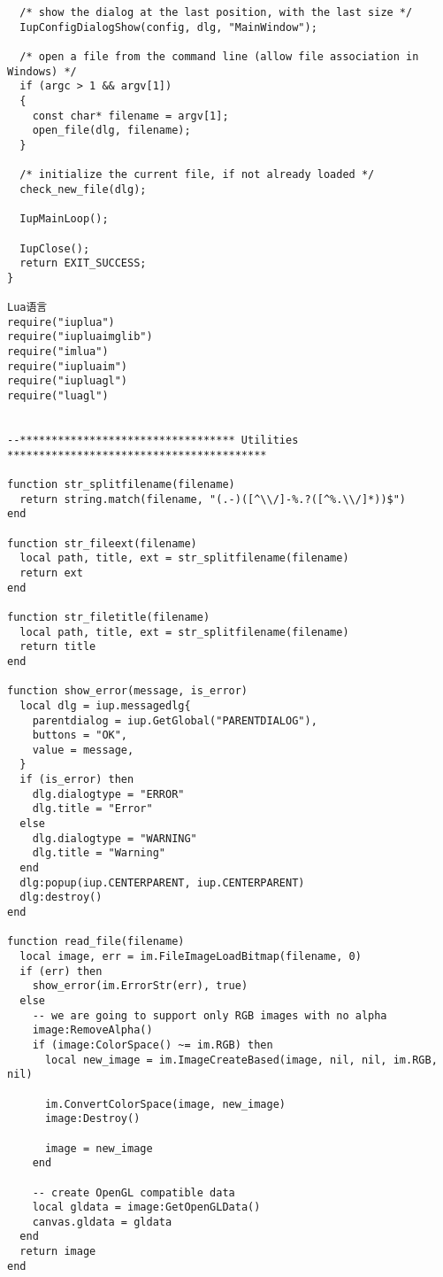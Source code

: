 \documentclass{ctexart}
\begin{document}
\begin{lstlisting}
  /* show the dialog at the last position, with the last size */
  IupConfigDialogShow(config, dlg, "MainWindow");

  /* open a file from the command line (allow file association in Windows) */
  if (argc > 1 && argv[1])
  {
    const char* filename = argv[1];
    open_file(dlg, filename);
  }

  /* initialize the current file, if not already loaded */
  check_new_file(dlg);

  IupMainLoop();

  IupClose();
  return EXIT_SUCCESS;
}

Lua语言
require("iuplua")
require("iupluaimglib")
require("imlua")
require("iupluaim")
require("iupluagl")
require("luagl")


--********************************** Utilities *****************************************

function str_splitfilename(filename)
  return string.match(filename, "(.-)([^\\/]-%.?([^%.\\/]*))$")
end

function str_fileext(filename)
  local path, title, ext = str_splitfilename(filename)
  return ext
end

function str_filetitle(filename)
  local path, title, ext = str_splitfilename(filename)
  return title
end

function show_error(message, is_error)
  local dlg = iup.messagedlg{
    parentdialog = iup.GetGlobal("PARENTDIALOG"),
    buttons = "OK",
    value = message,
  }
  if (is_error) then
    dlg.dialogtype = "ERROR"
    dlg.title = "Error"
  else
    dlg.dialogtype = "WARNING"
    dlg.title = "Warning"
  end
  dlg:popup(iup.CENTERPARENT, iup.CENTERPARENT)
  dlg:destroy()
end

function read_file(filename)
  local image, err = im.FileImageLoadBitmap(filename, 0)
  if (err) then
    show_error(im.ErrorStr(err), true)
  else
    -- we are going to support only RGB images with no alpha
    image:RemoveAlpha()
    if (image:ColorSpace() ~= im.RGB) then
      local new_image = im.ImageCreateBased(image, nil, nil, im.RGB, nil)        

      im.ConvertColorSpace(image, new_image)
      image:Destroy()

      image = new_image
    end

    -- create OpenGL compatible data
    local gldata = image:GetOpenGLData()
    canvas.gldata = gldata
  end
  return image
end


\end{lstlisting}
\end{document}
